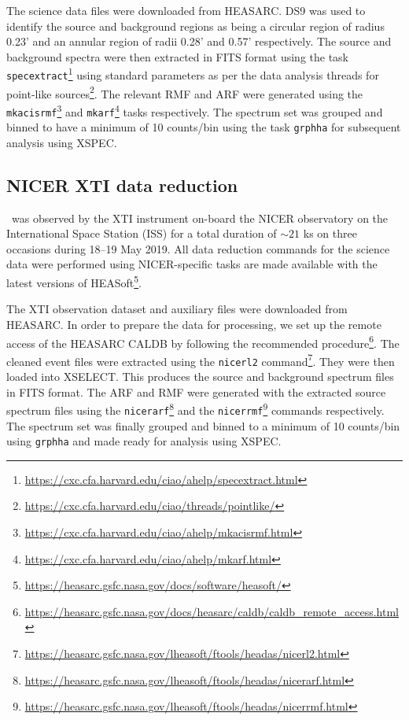     	The science data files were downloaded from HEASARC. DS9 was used to identify the source and background regions as being a circular region of radius 0.23' and an annular region of radii 0.28' and 0.57' respectively. The source and background spectra were then extracted in FITS format using the task \texttt{specextract}\footnote{\url{https://cxc.cfa.harvard.edu/ciao/ahelp/specextract.html}} using standard parameters as per the data analysis threads for point-like sources\footnote{\url{https://cxc.cfa.harvard.edu/ciao/threads/pointlike/}}. The relevant RMF and ARF were generated using the \texttt{mkacisrmf}\footnote{\url{https://cxc.cfa.harvard.edu/ciao/ahelp/mkacisrmf.html}} and \texttt{mkarf}\footnote{\url{https://cxc.cfa.harvard.edu/ciao/ahelp/mkarf.html}} tasks respectively. The spectrum set was grouped and binned to have a minimum of 10 counts/bin using the task \texttt{grphha} for subsequent analysis using XSPEC.
    
    \subsection{NICER XTI data reduction}
    	\source\ was observed by the XTI instrument on-board the NICER observatory on the International Space Station (ISS) for a total duration of $\sim 21$ ks on three occasions during 18--19 May 2019. All data reduction commands for the science data were performed using NICER-specific tasks are made available with the latest versions of HEASoft\footnote{\url{https://heasarc.gsfc.nasa.gov/docs/software/heasoft/}}.
    	
    	The XTI observation dataset and auxiliary files were downloaded from HEASARC. In order to prepare the data for processing, we set up the remote access of the HEASARC CALDB by following the recommended procedure\footnote{\url{https://heasarc.gsfc.nasa.gov/docs/heasarc/caldb/caldb_remote_access.html}}. The cleaned event files were extracted using the \texttt{nicerl2} command\footnote{\url{https://heasarc.gsfc.nasa.gov/lheasoft/ftools/headas/nicerl2.html}}. They were then loaded into XSELECT. This produces the source and background spectrum files in FITS format. The ARF and RMF were generated with the extracted source spectrum files using the \texttt{nicerarf}\footnote{\url{https://heasarc.gsfc.nasa.gov/lheasoft/ftools/headas/nicerarf.html}} and the \texttt{nicerrmf}\footnote{\url{https://heasarc.gsfc.nasa.gov/lheasoft/ftools/headas/nicerrmf.html}} commands respectively. The spectrum set was finally grouped and binned to a minimum of 10 counts/bin using \texttt{grphha} and made ready for analysis using XSPEC.